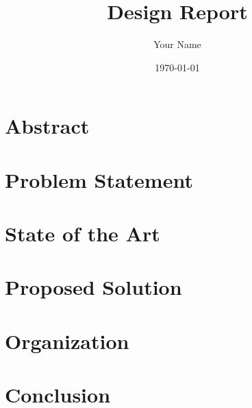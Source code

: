 \documentclass[a4paper]{article}
\title{Design Report}
\author{Your Name}
\date{\today}
\begin{document}
\begin{titlepage}
    \maketitle
    \vspace{2cm}
    \tableofcontents
\end{titlepage}

\section{Abstract}
\section{Problem Statement}
\section{State of the Art}
\section{Proposed Solution}
\section{Organization}
\section{Conclusion}
\end{document}
